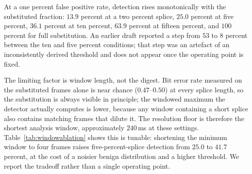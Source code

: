 At a one percent false positive rate, detection rises monotonically with the
substituted fraction: $13.9$ percent at a two percent splice, $25.0$ percent at
five percent, $36.1$ percent at ten percent, $63.9$ percent at fifteen percent,
and $100$ percent for full substitution. An earlier draft reported a step from
$53$ to $8$ percent between the ten and five percent conditions; that step was
an artefact of an inconsistently derived threshold and does not appear once the
operating point is fixed.

The limiting factor is window length, not the digest. Bit error rate measured on
the substituted frames alone is near chance ($0.47$--$0.50$) at every splice
length, so the substitution is always visible in principle; the windowed maximum
the detector actually computes is lower, because any window containing a short
splice also contains matching frames that dilute it. The resolution floor is
therefore the shortest analysis window, approximately $240$\,ms at these
settings. Table~\ref{tab:windowablation} shows this is tunable: shortening the
minimum window to four frames raises five-percent-splice detection from $25.0$
to $41.7$ percent, at the cost of a noisier benign distribution and a higher
threshold. We report the tradeoff rather than a single operating point.



%

%
%
%
%
